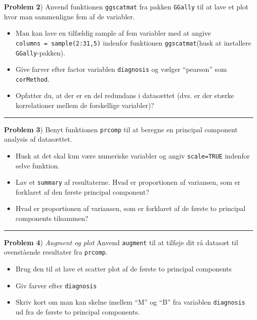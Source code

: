 \documentclass[
]{book}
\providecommand{\tightlist}{%
  \setlength{\itemsep}{0pt}\setlength{\parskip}{0pt}}
\begin{document}
\textbf{Problem 2}) Anvend funktionen \texttt{ggscatmat} fra pakken \texttt{GGally} til at lave et plot hvor man sammenligne fem af de variabler.

\begin{itemize}
\tightlist
\item
  Man kan lave en tilfældig sample af fem variabler med at angive \texttt{columns\ =\ sample(2:31,5)} indenfor funktionen \texttt{ggscatmat}(husk at installere \texttt{GGally}-pakken).
\item
  Give farver efter factor variablen \texttt{diagnosis} og vælger ``pearson'' som \texttt{corMethod}.
\item
  Opfatter du, at der er en del redundans i datasættet (dvs. er der stærke korrelationer mellem de forskellige variabler)?
\end{itemize}

\begin{center}\rule{0.5\linewidth}{0.5pt}\end{center}

\textbf{Problem 3}) Benyt funktionen \texttt{prcomp} til at beregne en principal component analysis af datasættet.

\begin{itemize}
\tightlist
\item
  Husk at det skal kun være numeriske variabler og angiv \texttt{scale=TRUE} indenfor selve funktion.
\item
  Lav et \texttt{summary} af resultaterne. Hvad er proportionen af variansen, som er forklaret af den første principal component?
\item
  Hvad er proportionen af variansen, som er forklaret af de første to principal components tilsammen?
\end{itemize}

\begin{center}\rule{0.5\linewidth}{0.5pt}\end{center}

\textbf{Problem 4}) \emph{Augment og plot} Anvend \texttt{augment} til at tilføje dit rå datasæt til ovenstående resultater fra \texttt{prcomp}.

\begin{itemize}
\tightlist
\item
  Brug den til at lave et scatter plot af de første to principal components
\item
  Giv farver efter \texttt{diagnosis}
\item
  Skriv kort om man kan skelne imellem ``M'' og ``B'' fra variablen \texttt{diagnosis} ud fra de første to principal components.
\end{itemize}
\end{document}
